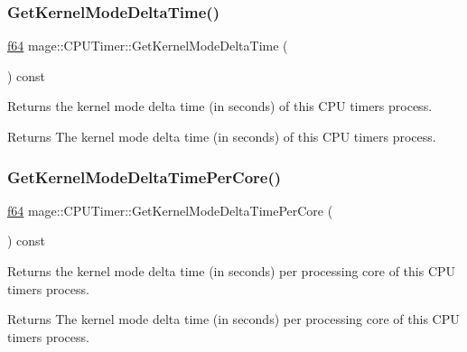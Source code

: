 \subsubsection{\texorpdfstring{Get\+Kernel\+Mode\+Delta\+Time()}{GetKernelModeDeltaTime()}}
{\footnotesize\ttfamily \hyperlink{namespacemage_ab935747c6941320bd6214b5a5f265b09}{f64} mage\+::\+C\+P\+U\+Timer\+::\+Get\+Kernel\+Mode\+Delta\+Time (\begin{DoxyParamCaption}{ }\end{DoxyParamCaption}) const\hspace{0.3cm}{\ttfamily [noexcept]}}

Returns the kernel mode delta time (in seconds) of this C\+PU timer\textquotesingle{}s process.

\begin{DoxyReturn}{Returns}
The kernel mode delta time (in seconds) of this C\+PU timer\textquotesingle{}s process. 
\end{DoxyReturn}
\hypertarget{classmage_1_1_c_p_u_timer_a448fd3861f8a1c1292abe62f23b7fa13}{}\label{classmage_1_1_c_p_u_timer_a448fd3861f8a1c1292abe62f23b7fa13} 
\subsubsection{\texorpdfstring{Get\+Kernel\+Mode\+Delta\+Time\+Per\+Core()}{GetKernelModeDeltaTimePerCore()}}
{\footnotesize\ttfamily \hyperlink{namespacemage_ab935747c6941320bd6214b5a5f265b09}{f64} mage\+::\+C\+P\+U\+Timer\+::\+Get\+Kernel\+Mode\+Delta\+Time\+Per\+Core (\begin{DoxyParamCaption}{ }\end{DoxyParamCaption}) const\hspace{0.3cm}{\ttfamily [noexcept]}}

Returns the kernel mode delta time (in seconds) per processing core of this C\+PU timer\textquotesingle{}s process.

\begin{DoxyReturn}{Returns}
The kernel mode delta time (in seconds) per processing core of this C\+PU timer\textquotesingle{}s process. 
\end{DoxyReturn}
\hypertarget{classmage_1_1_c_p_u_timer_ae13da8e25167ec92802d272901e2598c}{}\label{classmage_1_1_c_p_u_timer_ae13da8e25167ec92802d272901e2598c} 
